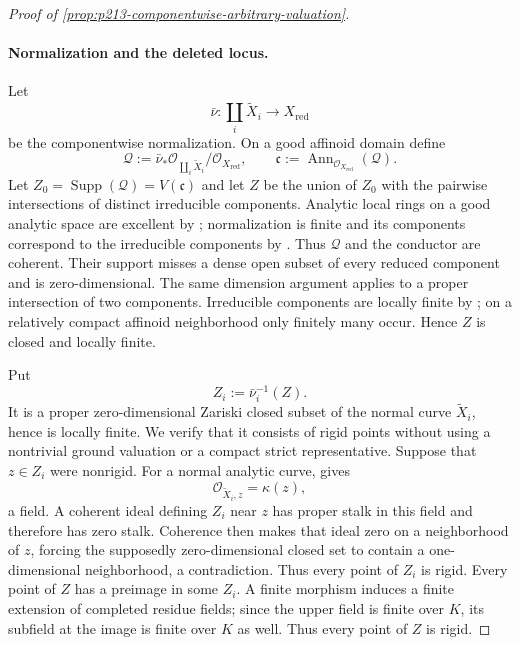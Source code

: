 \begin{proof}[Proof of
\cref{prop:p213-componentwise-arbitrary-valuation}]
\paragraph{Normalization and the deleted locus.}
Let
\[
 \bar\nu:\coprod_i\widetilde X_i\longrightarrow X_{\mathrm{red}}
\]
be the componentwise normalization.  On a good affinoid domain define
\[
 \mathcal Q:=\bar\nu_*\mathcal O_{\coprod_i\widetilde X_i}
                  /\mathcal O_{X_{\mathrm{red}}},
 \qquad
 \mathfrak c:=\operatorname{Ann}_{\mathcal O_{X_{\mathrm{red}}}}
                  (\mathcal Q).
\]
Let $Z_0=\operatorname{Supp}(\mathcal Q)=V(\mathfrak c)$ and let $Z$ be
the union of $Z_0$ with the pairwise intersections of distinct irreducible
components.  Analytic local rings on a good analytic space are excellent by
\cite[\S11.1.10]{CLD25}; normalization is finite and its components
correspond to the irreducible components by \cite[\S11.3.1]{CLD25}.
Thus $\mathcal Q$ and the conductor are coherent.  Their support misses a
dense open subset of every reduced component and is zero-dimensional.
The same dimension argument applies to a proper intersection of two
components.  Irreducible components are locally finite by
\cite[\S11.2.5]{CLD25}; on a relatively compact affinoid neighborhood only
finitely many occur.  Hence $Z$ is closed and locally finite.

Put
\begin{equation}
 \label{eq:p213-componentwise-av-conductor-preimage}
                         Z_i:=\bar\nu_i^{-1}(Z).
\end{equation}
It is a proper zero-dimensional Zariski closed subset of the normal curve
$\widetilde X_i$, hence is locally finite.  We verify that it consists of
rigid points without using a nontrivial ground valuation or a compact
strict representative.  Suppose that $z\in Z_i$ were nonrigid.  For a
normal analytic curve, \cite[\S4.2.18]{Ducros24CurveStructure} gives
\[
                 \mathcal O_{\widetilde X_i,z}=\kappa(z),
\]
a field.  A coherent ideal defining $Z_i$ near $z$ has proper stalk in
this field and therefore has zero stalk.  Coherence then makes that ideal
zero on a neighborhood of $z$, forcing the supposedly zero-dimensional
closed set to contain a one-dimensional neighborhood, a contradiction.
Thus every point of $Z_i$ is rigid.  Every point of $Z$ has a preimage in
some $Z_i$.  A finite morphism induces a finite extension of completed
residue fields; since the upper field is finite over $K$, its subfield at
the image is finite over $K$ as well.  Thus every point of $Z$ is rigid.


\end{proof}
